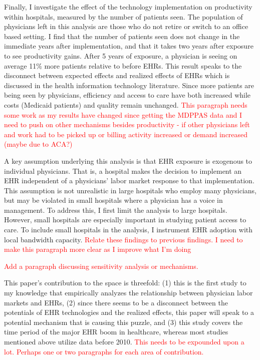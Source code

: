 \documentclass[11pt]{article}
\begin{document}
Finally, I investigate the effect of the technology implementation on productivity within hospitals, measured by the number of patients seen. The population of physicians left in this analysis are those who do not retire or switch to an office based setting. I find that the number of patients seen does not change in the immediate years after implementation, and that it takes two years after exposure to see productivity gains. After 5 years of exposure, a physician is seeing on average 11\% more patients relative to before EHRs. This result speaks to the disconnect between expected effects and realized effects of EHRs which is discussed in the health information technology literature. Since more patients are being seen by physicians, efficiency and access to care have both increased while costs (Medicaid patients) and quality remain unchanged. \textcolor{red}{This paragraph needs some work as my results have changed since getting the MDPPAS data and I need to push on other mechanisms besides productivity - if other physicians left and work had to be picked up or billing activity increased or demand increased (maybe due to ACA?)}

A key assumption underlying this analysis is that EHR exposure is exogenous to individual physicians. That is, a hospital makes the decision to implement an EHR independent of a physicians' labor market response to that implementation. This assumption is not unrealistic in large hospitals who employ many physicians, but may be violated in small hospitals where a physician has a voice in management. To address this, I first limit the analysis to large hospitals. However, small hospitals are especially important in studying patient access to care. To include small hospitals in the analysis, I instrument EHR adoption with local bandwidth capacity. \textcolor{red}{Relate these findings to previous findings. I need to make this paragraph more clear as I improve what I'm doing}

\textcolor{red}{Add a paragraph discussing sensitivity analysis or mechanisms.}

This paper's contribution to the space is threefold: (1) this is the first study to my knowledge that empirically analyzes the relationship between physician labor markets and EHRs, (2) since there seems to be a disconnect between the potentials of EHR technologies and the realized effects, this paper will speak to a potential mechanism that is causing this puzzle, and (3) this study covers the time period of the major EHR boom in healthcare, whereas most studies mentioned above utilize data before 2010. \textcolor{red}{This needs to be expounded upon a lot. Perhaps one or two paragraphs for each area of contribution.}
\end{document}
